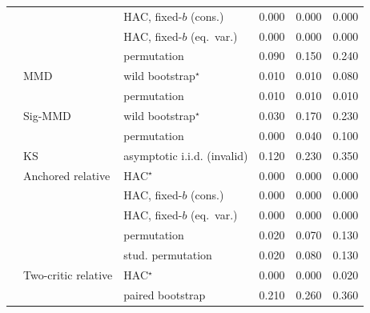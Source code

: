 \begin{tabular}{lllrrr}
 &  & HAC, fixed-$b$ (cons.) & 0.000 & 0.000 & 0.000 \\
 &  & HAC, fixed-$b$ (eq.\ var.) & 0.000 & 0.000 & 0.000 \\
 &  & permutation & 0.090 & 0.150 & 0.240 \\
 & MMD & wild bootstrap$^{\star}$ & 0.010 & 0.010 & 0.080 \\
 &  & permutation & 0.010 & 0.010 & 0.010 \\
 & Sig-MMD & wild bootstrap$^{\star}$ & 0.030 & 0.170 & 0.230 \\
 &  & permutation & 0.000 & 0.040 & 0.100 \\
 & KS & asymptotic i.i.d. (invalid) & 0.120 & 0.230 & 0.350 \\
 & Anchored relative & HAC$^{\star}$ & 0.000 & 0.000 & 0.000 \\
 &  & HAC, fixed-$b$ (cons.) & 0.000 & 0.000 & 0.000 \\
 &  & HAC, fixed-$b$ (eq.\ var.) & 0.000 & 0.000 & 0.000 \\
 &  & permutation & 0.020 & 0.070 & 0.130 \\
 &  & stud. permutation & 0.020 & 0.080 & 0.130 \\
 & Two-critic relative & HAC$^{\star}$ & 0.000 & 0.000 & 0.020 \\
 &  & paired bootstrap & 0.210 & 0.260 & 0.360 \\
\bottomrule
\end{tabular}
